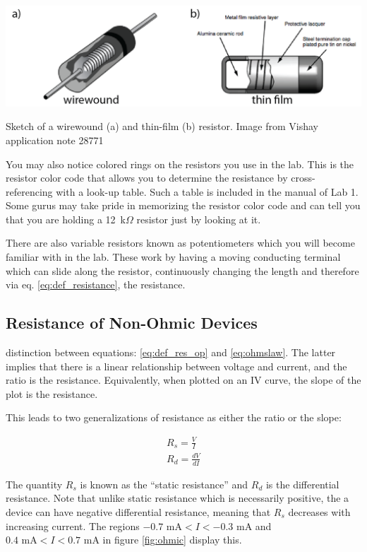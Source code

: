 \documentclass{tufte-book}
\begin{document}
\begin{marginfigure}%
  \includegraphics[width=\linewidth]{someresistors}
\caption{Sketch of a wirewound (a) and thin-film (b) resistor. Image from Vishay application note 28771}
  \label{fig:someresistors}
\end{marginfigure}

You may also notice colored rings on the resistors you use in the lab. This is the resistor color code that allows you to determine the resistance by cross-referencing with a look-up table. Such a table is included in the manual of Lab 1.  Some gurus may take pride in memorizing the resistor color code and can tell you that you are holding a 12~k$\Omega$ resistor just by looking at it.

There are also variable resistors known as potentiometers which you will become familiar with in the lab. These work by having a moving conducting terminal which can slide along the resistor, continuously changing the length and therefore via eq. \ref{eq:def_resistance}, the resistance.


\subsection{Resistance of Non-Ohmic Devices}
 distinction between equations: \ref{eq:def_res_op} and \ref{eq:ohmslaw}. The latter implies that there is a linear relationship between voltage and current, and the ratio is the resistance. Equivalently, when plotted on an IV curve, the slope of the plot is the resistance.

This leads to two generalizations of resistance as either the ratio or the slope:

\begin{subequations}
\begin{align}
    R_{s} = \frac{V}{I}\label{eq:genres1}\\
   R_d = \frac{dV}{dI} \label{eq:genres2}
\end{align}
\end{subequations}

The quantity $R_s$ is known as the ``static resistance'' and $R_d$ is the differential resistance. Note that unlike static resistance which is necessarily positive, the a device can have negative differential resistance, meaning that $R_s$ decreases with increasing current. The regions $-0.7\text{ mA}  < I < -0.3\text{ mA}$ and $0.4\text{ mA}  < I < 0.7\text{ mA}$ in figure \ref{fig:ohmic} display this.
\end{document}
